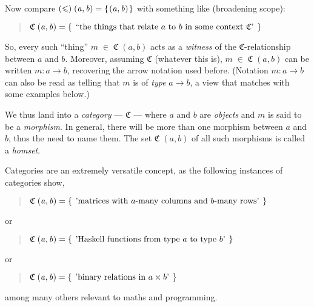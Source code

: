 \documentclass{elsarticle}
\newcommand{\Varid}[1]{\mathit{#1}}
\renewcommand{\leq}{\leqslant}
\def\cat#1{{\mathfrak #1}}
\begin{document}
Now compare
\ensuremath{(\leq )\;(\Varid{a},\Varid{b})\mathrel{=}\{\mskip1.5mu (\Varid{a},\Varid{b})\mskip1.5mu\}}
with something like (broadening scope):
\begin{quote}
\ensuremath{\cat{C}\;(\Varid{a},\Varid{b})\mathrel{=}\{\mskip1.5mu \mbox{ ``the things that relate $a$ to $b$ in some context $\cat{C}$' }\mskip1.5mu\}}
\end{quote}
So, every such ``thing'' \ensuremath{\Varid{m}\;\mathbin\in \;\cat{C}\;(\Varid{a},\Varid{b})} acts as a \emph{witness} of the
\ensuremath{\cat{C}}-relationship between \ensuremath{\Varid{a}} and \ensuremath{\Varid{b}}. Moreover, assuming \ensuremath{\cat{C}} (whatever this is), \ensuremath{\Varid{m}\;\mathbin\in \;\cat{C}\;(\Varid{a},\Varid{b})} can be written \ensuremath{\Varid{m}\mathbin{:}\Varid{a}\to \Varid{b}}, recovering the arrow notation used before.
(Notation \ensuremath{\Varid{m}\mathbin{:}\Varid{a}\to \Varid{b}} can also be read as telling that \ensuremath{\Varid{m}} is of \emph{type} \ensuremath{\Varid{a}\to \Varid{b}}, a view that matches with some examples below.)

We thus land into a \emph{category} --- \ensuremath{\cat{C}} --- where \ensuremath{\Varid{a}} and \ensuremath{\Varid{b}} are \emph{objects} and \ensuremath{\Varid{m}} is said to be a \emph{morphism}. In general, there will be more than one morphism between \ensuremath{\Varid{a}} and \ensuremath{\Varid{b}}, thus the need to name them. The set \ensuremath{\cat{C}\;(\Varid{a},\Varid{b})} of all such morphisms is called a \emph{homset}. 

Categories are an extremely versatile concept, as the following instances of categories show,
\begin{quote}
\ensuremath{\cat{C}\;(\Varid{a},\Varid{b})\mathrel{=}\{\mskip1.5mu \mbox{ 'matrices with $ a$-many columns and $ b$-many rows' }\mskip1.5mu\}}
\end{quote}
or
\begin{quote}
\ensuremath{\cat{C}\;(\Varid{a},\Varid{b})\mathrel{=}\{\mskip1.5mu \mbox{ 'Haskell functions from type $ a$ to type $ b$' }\mskip1.5mu\}}
\end{quote}
or
\begin{quote}
\ensuremath{\cat{C}\;(\Varid{a},\Varid{b})\mathrel{=}\{\mskip1.5mu \mbox{ 'binary relations in ${ a}\times{ b}$' }\mskip1.5mu\}}
\end{quote}
among many others relevant to maths and programming.
\end{document}
